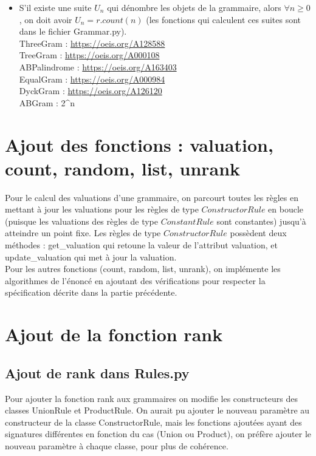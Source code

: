 \documentclass[a4paper, titlepage]{article}
\begin{document}
\begin{itemize}
\item S'il existe une suite $U_n$ qui dénombre les objets de la
  grammaire, alors $\forall n \geq 0$, on doit avoir $U_n =
  r.count(n)$ (les fonctions qui calculent ces suites sont dans le
  fichier Grammar.py).\\

  ThreeGram : \url{https://oeis.org/A128588}\\
  TreeGram  : \url{https://oeis.org/A000108}\\
  ABPalindrome : \url{https://oeis.org/A163403}\\
  EqualGram : \url{https://oeis.org/A000984}\\
  DyckGram  : \url{https://oeis.org/A126120}\\
  ABGram    : 2^{n} \\
  
\end{itemize}

\section {Ajout des fonctions : valuation, count, random, list,  unrank}

Pour le calcul des valuations d'une grammaire, on parcourt toutes les
règles en mettant à jour les valuations pour les règles de type
$ConstructorRule$ en boucle (puisque les valuations des règles de type
$ConstantRule$ sont constantes) jusqu'à atteindre un point fixe.
Les règles de type $ConstructorRule$ possèdent deux méthodes :
get\_valuation qui retoune la valeur de l'attribut valuation, et
update\_valuation qui met à jour la valuation. \\

Pour les autres fonctions (count, random, list, unrank), on implémente
les algorithmes de l'énoncé en ajoutant des vérifications pour
respecter la spécification décrite dans la partie précédente.


\section {Ajout de la fonction rank}

\subsection {Ajout de rank dans Rules.py}
Pour ajouter la fonction rank aux grammaires on modifie les
constructeurs des classes UnionRule et ProductRule.
On aurait pu ajouter le nouveau paramètre au constructeur de la
classe ConstructorRule, mais les fonctions ajoutées ayant des
signatures différentes en fonction du cas (Union ou Product), on
préfère ajouter le nouveau paramètre à chaque classe, pour plus de
cohérence.\\
\end{document}
